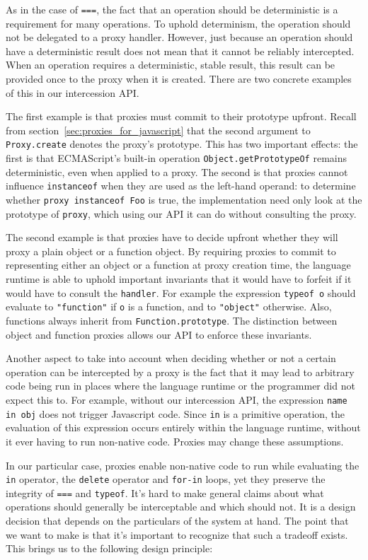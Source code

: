 \documentclass{sig-alternate}
\begin{document}
As in the case of \texttt{===}, the fact that an operation should be deterministic is a requirement for many operations. To uphold determinism, the operation should not be delegated to a proxy handler. However, just because an operation should have a deterministic result does not mean that it cannot be reliably intercepted. When an operation requires a deterministic, stable result, this result can be provided once to the proxy when it is created. There are two concrete examples of this in our intercession API.

The first example is that proxies must commit to their prototype upfront. Recall from section~\ref{sec:proxies_for_javascript} that the second argument to \texttt{Proxy.create} denotes the proxy's prototype. This has two important effects: the first is that ECMAScript's built-in operation \texttt{Object.getPrototypeOf} remains deterministic, even when applied to a proxy. The second is that proxies cannot influence \texttt{instanceof} when they are used as the left-hand operand: to determine whether \texttt{proxy instanceof Foo} is true, the implementation need only look at the prototype of \texttt{proxy}, which using our API it can do without consulting the proxy.

The second example is that proxies have to decide upfront whether they will proxy a plain object or a function object. By requiring proxies to commit to representing either an object or a function at proxy creation time, the language runtime is able to uphold important invariants that it would have to forfeit if it would have to consult the \texttt{handler}. For example the expression \texttt{typeof o} should evaluate to \texttt{"function"} if \texttt{o} is a function, and to \texttt{"object"} otherwise. Also, functions always inherit from \texttt{Function.prototype}. The distinction between object and function proxies allows our API to enforce these invariants.

Another aspect to take into account when deciding whether or not a certain operation can be intercepted by a proxy is the fact that it may lead to arbitrary code being run in places where the language runtime or the programmer did not expect this to. For example, without our intercession API, the expression \texttt{name in obj} does not trigger Javascript code. Since \texttt{in} is a primitive operation, the evaluation of this expression occurs entirely within the language runtime, without it ever having to run non-native code. Proxies may change these assumptions.

In our particular case, proxies enable non-native code to run while evaluating the \texttt{in} operator, the \texttt{delete} operator and \texttt{for-in} loops, yet they preserve the integrity of \texttt{===} and \texttt{typeof}. It's hard to make general claims about what operations should generally be interceptable and which should not. It is a design decision that depends on the particulars of the system at hand. The point that we want to make is that it's important to recognize that such a tradeoff exists. This brings us to the following design principle:
\end{document}
